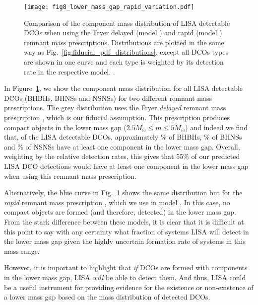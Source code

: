 \begin{figure}[tb]
    \centering
    \texttt{[image: fig8\_lower\_mass\_gap\_rapid\_variation.pdf]}
    \caption{Comparison of the component mass distribution of LISA detectable DCOs when using the Fryer delayed (model \modFid{}) and rapid (model \modRapid{}) remnant mass prescriptions. Distributions are plotted in the same way as Fig.~\ref{fig:fiducial_pdf_distributions}, except all DCOs types are shown in one curve and each type is weighted by its detection rate in the respective model. \href{https://github.com/TomWagg/detecting-DCOs-in-LISA/blob/main/paper/figures/fig8_lower_mass_gap_rapid_variation.pdf}{\faFileImage} \href{https://github.com/TomWagg/detecting-DCOs-in-LISA/blob/main/paper/figure_notebooks/variations.ipynb}{\faBook}.}
    \label{fig:lower_mass_gap_variation}
\end{figure}

In Figure~\ref{fig:lower_mass_gap_variation}, we show the component mass distribution for all LISA detectable DCOs (BHBHs, BHNSs and NSNSs) for two different remnant mass prescriptions. The grey distribution uses the Fryer \textit{delayed} remnant mass prescription \citep{Fryer+2012}, which is our fiducial assumption. This prescription produces compact objects in the lower mass gap ($2.5 \unit{M_{\odot}} \le m \le 5 \unit{M_{\odot}}$) and indeed we find that, of the LISA detectable DCOs, approximately \BHBHatLeastOneLowerMassGapPerc{}\% of BHBHs, \BHNSatLeastOneLowerMassGapPerc{}\% of BHNSs and \NSNSatLeastOneLowerMassGapPerc{}\% of NSNSs have at least one component in the lower mass gap. Overall, weighting by the relative detection rates, this gives that 55\% of our predicted LISA DCO detections  would have at least one component in the lower mass gap when using this remnant mass prescription.

Alternatively, the blue curve in Fig.~\ref{fig:lower_mass_gap_variation} shows the same distribution but for the \textit{rapid} remnant mass prescription \citep{Fryer+2012}, which we use in model \modRapid{}. In this case, no compact objects are formed (and therefore, detected) in the lower mass gap. From the stark difference between these models, it is clear that it is difficult at this point to say with any certainty what fraction of systems LISA will detect in the lower mass gap given the highly uncertain formation rate of systems in this mass range.

However, it is important to highlight that \textit{if} DCOs are formed with components in the lower mass gap, LISA \textit{will} be able to detect them. And thus, LISA could be a useful instrument for providing evidence for the existence or non-existence of a lower mass gap based on the mass distribution of detected DCOs.

